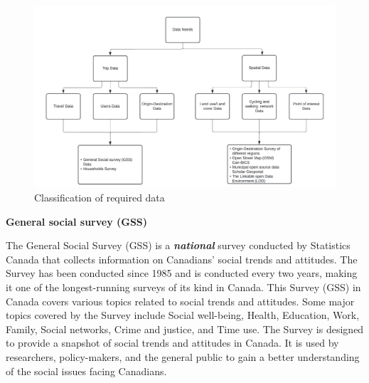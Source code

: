 \documentclass[
11pt, %
oneside, %
english, %
singlespacing, %
]{macthesis} %
\begin{document}
\begin{figure}

{\centering \includegraphics[width=1\linewidth]{figure/ch02-Fig-01} 

}

\caption{Classification of required data}\label{fig:ch02-plot-fig-01}
\end{figure}

\textbf{General social survey (GSS)}

The General Social Survey (GSS) is a \textbf{\emph{national}} survey conducted by Statistics Canada that collects information on Canadians' social trends and attitudes. The Survey has been conducted since 1985 and is conducted every two years, making it one of the longest-running surveys of its kind in Canada. This Survey (GSS) in Canada covers various topics related to social trends and attitudes. Some major topics covered by the Survey include Social well-being, Health, Education, Work, Family, Social networks, Crime and justice, and Time use. The Survey is designed to provide a snapshot of social trends and attitudes in Canada. It is used by researchers, policy-makers, and the general public to gain a better understanding of the social issues facing Canadians.
\end{document}
